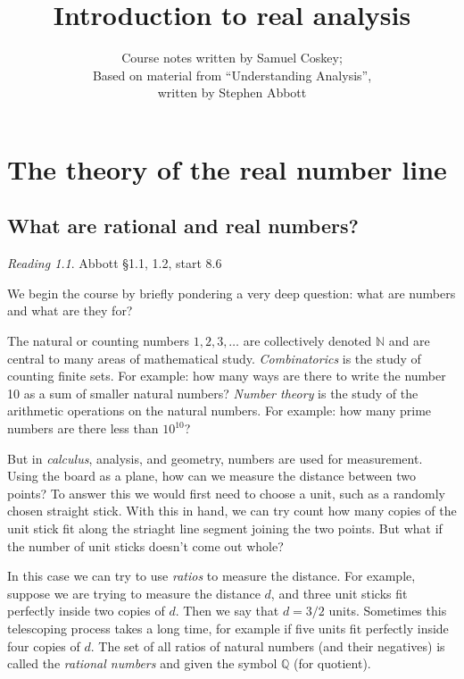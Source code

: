 \documentclass[11pt,oneside]{amsbook}
\title{Introduction to real analysis}
\author{Course notes written by Samuel Coskey;\\Based on material from ``Understanding Analysis'',\\written by Stephen Abbott}
\newcommand{\N}{\mathbb N}
\newcommand{\Q}{\mathbb Q}
\theoremstyle{definition}
\theoremstyle{plain}
\theoremstyle{definition}
\theoremstyle{remark}
\newtheorem*{reading}{Reading}
\numberwithin{equation}{section}
\numberwithin{figure}{section}
\begin{document}
\maketitle

\tableofcontents

\chapter{The theory of the real number line}

\section{What are rational and real numbers?}

\begin{reading}
  Abbott \S 1.1, 1.2, start 8.6
\end{reading}


We begin the course by briefly pondering a very deep question: what are numbers and what are they for?

The natural or counting numbers $1,2,3,\ldots$ are collectively denoted $\N$ and are central to many areas of mathematical study. \emph{Combinatorics} is the study of counting finite sets. For example: how many ways are there to write the number 10 as a sum of smaller natural numbers? \emph{Number theory} is the study of the arithmetic operations on the natural numbers. For example: how many prime numbers are there less than $10^{10}$?

But in \emph{calculus}, analysis, and geometry, numbers are used for measurement. Using the board as a plane, how can we measure the distance between two points? To answer this we would first need to choose a unit, such as a randomly chosen straight stick. With this in hand, we can try count how many copies of the unit stick fit along the striaght line segment joining the two points. But what if the number of unit sticks doesn't come out whole?

In this case we can try to use \emph{ratios} to measure the distance. For example, suppose we are trying to measure the distance $d$, and three unit sticks fit perfectly inside two copies of $d$. Then we say that $d=3/2$ units. Sometimes this telescoping process takes a long time, for example if five units fit perfectly inside four copies of $d$. The set of all ratios of natural numbers (and their negatives) is called the \emph{rational numbers} and given the symbol $\Q$ (for quotient).
\end{document}
